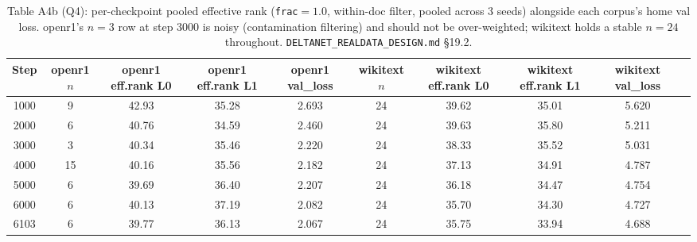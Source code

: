 \begin{table}[htbp]
\centering
\scriptsize
\begin{tabular}{cccccccccc}
\toprule
Step & openr1 $n$ & openr1 eff.rank L0 & openr1 eff.rank L1 & openr1 val\_loss & wikitext $n$ & wikitext eff.rank L0 & wikitext eff.rank L1 & wikitext val\_loss \\
\midrule
1000 & 9  & 42.93 & 35.28 & 2.693 & 24 & 39.62 & 35.01 & 5.620 \\
2000 & 6  & 40.76 & 34.59 & 2.460 & 24 & 39.63 & 35.80 & 5.211 \\
3000 & 3  & 40.34 & 35.46 & 2.220 & 24 & 38.33 & 35.52 & 5.031 \\
4000 & 15 & 40.16 & 35.56 & 2.182 & 24 & 37.13 & 34.91 & 4.787 \\
5000 & 6  & 39.69 & 36.40 & 2.207 & 24 & 36.18 & 34.47 & 4.754 \\
6000 & 6  & 40.13 & 37.19 & 2.082 & 24 & 35.70 & 34.30 & 4.727 \\
6103 & 6  & 39.77 & 36.13 & 2.067 & 24 & 35.75 & 33.94 & 4.688 \\
\bottomrule
\end{tabular}
\caption{Table A4b (Q4): per-checkpoint pooled effective rank (\texttt{frac}$=1.0$,
within-doc filter, pooled across 3 seeds) alongside each corpus's home val
loss. openr1's $n{=}3$ row at step 3000 is noisy (contamination
filtering) and should not be over-weighted; wikitext holds a stable
$n{=}24$ throughout. \texttt{DELTANET\_REALDATA\_DESIGN.md} \S19.2.}
\end{table}

